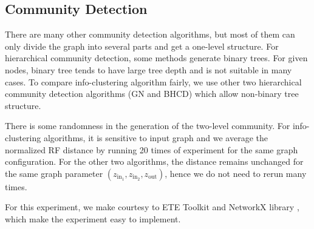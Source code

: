 \documentclass{article}
\begin{document}
\subsection{Community Detection}
There are many other community detection algorithms, but most of them can only divide the graph into several parts and get a one-level structure. For hierarchical community detection, some methods generate binary trees. For given nodes, binary tree tends to have large tree depth and is not suitable in many cases. To compare info-clustering algorithm fairly, we use other two hierarchical community detection algorithms (GN and BHCD) which allow non-binary tree structure.
 
There is some randomness in the generation of the two-level community. For info-clustering algorithms, it is sensitive to input graph and we average the normalized RF distance by running 20 times of experiment for the same graph configuration. For the other two algorithms, the distance remains unchanged for the same graph parameter $(z_{\mathrm{in}_1}, z_{\mathrm{in}_2}, z_{\mathrm{out}})$, hence we do not need to rerun many times.

For this experiment, we make courtesy to ETE Toolkit\cite{ete3} and NetworkX library \cite{SciPyProceedings_11}, which make the experiment easy to implement.



\end{document}
